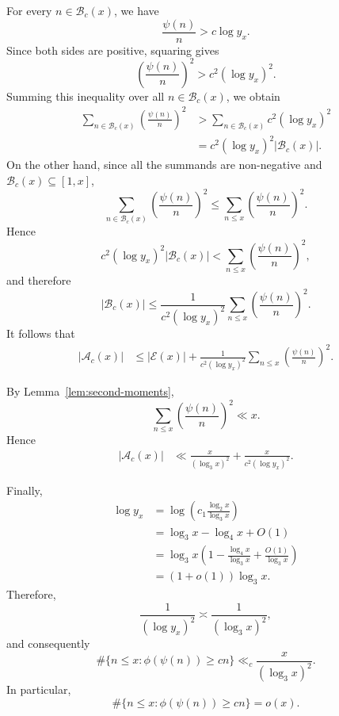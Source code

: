 \documentclass{article}
\theoremstyle{remark}
\begin{document}
For every \(n\in\mathcal B_c(x)\), we have
\[
        \frac{\psi(n)}n>c\log y_x.
\]
Since both sides are positive, squaring gives
\[
        \left(\frac{\psi(n)}n\right)^2
        >c^2(\log y_x)^2.
\]
Summing this inequality over all \(n\in\mathcal B_c(x)\), we obtain
\[
\begin{aligned}
 \sum_{n\in\mathcal B_c(x)}
 \left(\frac{\psi(n)}n\right)^2
 &>
 \sum_{n\in\mathcal B_c(x)}
 c^2(\log y_x)^2\\
 &=
 c^2(\log y_x)^2|\mathcal B_c(x)|.
\end{aligned}
\]
On the other hand, since all the summands are non-negative and
\(\mathcal B_c(x)\subseteq [1,x]\),
\[
        \sum_{n\in\mathcal B_c(x)}
        \left(\frac{\psi(n)}n\right)^2
        \leq
        \sum_{n\le x}
        \left(\frac{\psi(n)}n\right)^2.
\]
Hence
\[
        c^2(\log y_x)^2|\mathcal B_c(x)|
        <
        \sum_{n\le x}
        \left(\frac{\psi(n)}n\right)^2,
\]
and therefore
\[
        |\mathcal B_c(x)|
        \leq
        \frac1{c^2(\log y_x)^2}
        \sum_{n\le x}
        \left(\frac{\psi(n)}n\right)^2.
\]
It follows that
\[
\begin{aligned}
 |\mathcal A_c(x)|
 &\leq
 |\mathcal E(x)|
 +
 \frac1{c^2(\log y_x)^2}
 \sum_{n\le x}
 \left(\frac{\psi(n)}n\right)^2.
\end{aligned}
\]

By Lemma~\ref{lem:second-moments},
\[
        \sum_{n\le x}
        \left(\frac{\psi(n)}n\right)^2
        \ll x.
\]
Hence
\[
\begin{aligned}
 |\mathcal A_c(x)|
 &\ll
 \frac{x}{(\log_3x)^2}
 +
 \frac{x}{c^2(\log y_x)^2}.
\end{aligned}
\]

Finally,
\[
\begin{aligned}
 \log y_x
 &=\log\left(c_1\frac{\log_2x}{\log_3x}\right)\\
 &=\log_3x-\log_4x+O(1)\\
 &=\log_3x
 \left(
 1-\frac{\log_4x}{\log_3x}
 +\frac{O(1)}{\log_3x}
 \right)\\
 &=(1+o(1))\log_3x .
\end{aligned}
\]
Therefore,
\[
        \frac1{(\log y_x)^2}
        \asymp
        \frac1{(\log_3x)^2},
\]
and consequently
\[
        \#\{n\le x:\phi(\psi(n))\ge cn\}
        \ll_c
        \frac{x}{(\log_3x)^2}.
\]
In particular,
\[
        \#\{n\le x:\phi(\psi(n))\ge cn\}=o(x).
\]
\end{document}

